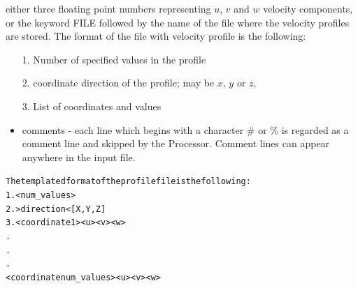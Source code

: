 \documentclass[10pt]{article}
\newcommand*{\tc}{\ttfamily} %
\newcommand*{\tn}{\sffamily} %
\begin{document}
    either three floating point numbers representing $u$, $v$
    and $w$ velocity components, or the keyword {\tc FILE}
    followed by the name of the file where the velocity profiles
    are stored. The format of the file with velocity profile is
    the following:
    \begin{itemize}
    \item[1.] Number of specified values in the profile
    \item[2.] coordinate direction of the profile; may be
              $x$, $y$ or $z$,
    \item[3.] List of coordinates and values
    \item comments - each line which begins with a character {\tc \#}
          or {\tc \%} is regarded as a comment line and skipped by the
          {\tn Processor}. Comment lines can appear anywhere in the
          input file.
    \end{itemize}
    \small
    \begin{alltt}
    The templated format of the profile file is the following:
    1. <num_values>
    2. >direction<  [X,Y,Z]
    3. <coordinate 1> <u> <v> <w>
       .
       .
       .
       <coordinate num_values> <u> <v> <w>
    \end{alltt}
    \normalsize
\end{document}
